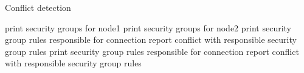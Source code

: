 \begin{algorithm}
    \caption{Conflict detection}
    \label{algo:connectivity}
    \begin{algorithmic}[1]
        \State print security groups for node1
        \State print security groups for node2
                \State print security group rules responsible for connection 
            \Else
                \State report conflict with responsible security group rules
            \EndIf
        \EndIf
                \State print security group rules responsible for connection 
            \Else
                \State report conflict with responsible security group rules
            \EndIf
        \EndIf
    \EndFunction
  \end{algorithmic}
\end{algorithm}

